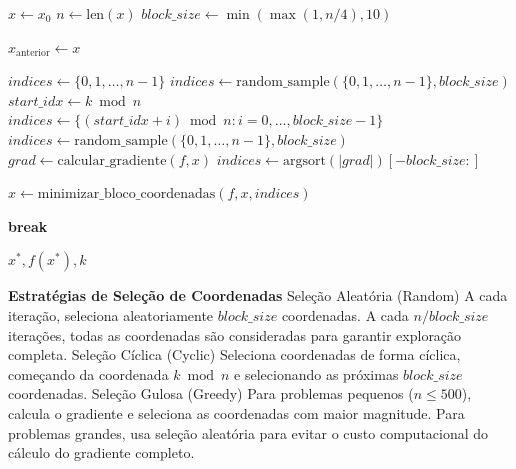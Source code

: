 \documentclass[12pt,a4paper]{article}
\begin{document}
\begin{algorithm}[H]
\caption{Método da Descida por Coordenadas com Estratégias de Seleção}
\label{alg:coordinate_descent}


\Statex

\State $x \leftarrow x_0$
\State $n \leftarrow \text{len}(x)$
\State $block\_size \leftarrow \min(\max(1, n/4), 10)$ 

    \State $x_{\text{anterior}} \leftarrow x$
    
    
            \State $indices \leftarrow \{0, 1, \ldots, n-1\}$
        \Else
            \State $indices \leftarrow \text{random\_sample}(\{0, 1, \ldots, n-1\}, block\_size)$
        \EndIf
        \State $start\_idx \leftarrow k \bmod n$
        \State $indices \leftarrow \{(start\_idx + i) \bmod n : i = 0, \ldots, block\_size-1\}$
            \State $indices \leftarrow \text{random\_sample}(\{0, 1, \ldots, n-1\}, block\_size)$
        \Else
            \State $grad \leftarrow \text{calcular\_gradiente}(f, x)$
            \State $indices \leftarrow \text{argsort}(|grad|)[-block\_size:]$
        \EndIf
    \EndIf
    
    \State $x \leftarrow \text{minimizar\_bloco\_coordenadas}(f, x, indices)$
    
        \State \textbf{break}
    \EndIf
\EndFor

\State \Return $x^*, f(x^*), k$
\end{algorithm}

\textbf{Estratégias de Seleção de Coordenadas}
\vspace{1cm}
{Seleção Aleatória (Random)}
A cada iteração, seleciona aleatoriamente $block\_size$ coordenadas. A cada $n/block\_size$ iterações, todas as coordenadas são consideradas para garantir exploração completa.
\vspace{1cm}
{Seleção Cíclica (Cyclic)}
Seleciona coordenadas de forma cíclica, começando da coordenada $k \bmod n$ e selecionando as próximas $block\_size$ coordenadas.
\vspace{1cm}
{Seleção Gulosa (Greedy)}
Para problemas pequenos ($n \leq 500$), calcula o gradiente e seleciona as coordenadas com maior magnitude. Para problemas grandes, usa seleção aleatória para evitar o custo computacional do cálculo do gradiente completo.
\end{document}
